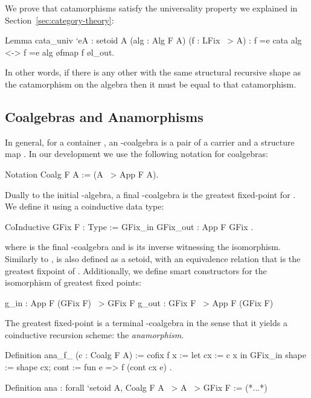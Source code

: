\documentclass[a4paper,anonymous, UKenglish,cleveref, autoref, thm-restate]{lipics-v2021}
\begin{document}
\noindent
We prove that catamorphisms satisfy the universality property we explained in
Section~\ref{sec:category-theory}:
\begin{coqcode}
Lemma cata_univ `{eA : setoid A} (alg : Alg F A) (f : LFix ~> A)
    : f =e cata alg <-> f =e alg \o fmap f \o l_out.
\end{coqcode}

\noindent
In other words, if there is any other  with the same structural recursive
shape as the catamorphism on the algebra  then it must be equal to that
catamorphism.

\subsection{Coalgebras and Anamorphisms}
\label{sec:coq-coalg}

In general, for a container , an -coalgebra is a pair of a carrier
 and a structure map .  In our development we use the
following notation for coalgebras:
\begin{coqcode}
Notation Coalg F A := (A ~> App F A).
\end{coqcode}

Dually to the initial -algebra, a final -coalgebra is the greatest
fixed-point for . We define it using a coinductive data type:
\begin{coqcode}
CoInductive GFix F : Type := GFix_in { GFix_out : App F GFix }.
\end{coqcode}

\noindent
where  is the final -coalgebra and  is its
inverse witnessing the isomorphism. Similarly to ,  is also
defined as a setoid, with an equivalence relation that is the greatest fixpoint
of . Additionally, we define smart constructors for the isomorphism of
greatest fixed points:
\begin{coqcode}
g_in : App F (GFix F) ~> GFix F          g_out : GFix F ~> App F (GFix F)
\end{coqcode}

The greatest fixed-point is a terminal -coalgebra in the sense that it
yields a coinductive recursion scheme: the \emph{anamorphism}.
\begin{coqcode}
Definition ana_f_ (c : Coalg F A) :=
  cofix f x :=
   let cx := c x in
   GFix_in { shape := shape cx; cont := fun e => f (cont cx e) }.

Definition ana : forall `{setoid A}, Coalg F A ~> A ~> GFix F := (*...*)
\end{coqcode}
\end{document}
